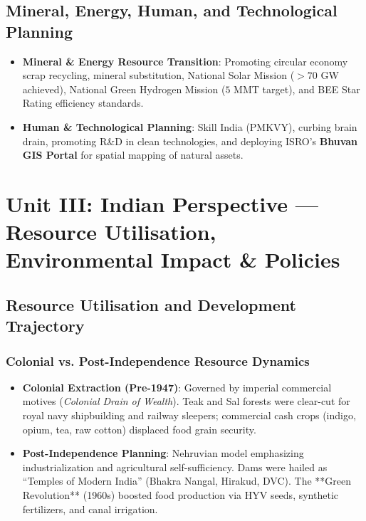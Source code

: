 \documentclass[11pt,a4paper]{article}
\begin{document}
\subsection{Mineral, Energy, Human, and Technological Planning}
\begin{itemize}[leftmargin=*]
  \item \textbf{Mineral \& Energy Resource Transition}: Promoting circular economy scrap recycling, mineral substitution, National Solar Mission ($>70$ GW achieved), National Green Hydrogen Mission ($5$ MMT target), and BEE Star Rating efficiency standards.
  \item \textbf{Human \& Technological Planning}: Skill India (PMKVY), curbing brain drain, promoting R\&D in clean technologies, and deploying ISRO's \textbf{Bhuvan GIS Portal} for spatial mapping of natural assets.
\end{itemize}

\newpage
\section{Unit III: Indian Perspective --- Resource Utilisation, Environmental Impact \& Policies}

\subsection{Resource Utilisation and Development Trajectory}

\subsubsection{Colonial vs. Post-Independence Resource Dynamics}
\begin{itemize}[leftmargin=*]
  \item \textbf{Colonial Extraction (Pre-1947)}: Governed by imperial commercial motives (\textit{Colonial Drain of Wealth}). Teak and Sal forests were clear-cut for royal navy shipbuilding and railway sleepers; commercial cash crops (indigo, opium, tea, raw cotton) displaced food grain security.
  \item \textbf{Post-Independence Planning}: Nehruvian model emphasizing industrialization and agricultural self-sufficiency. Dams were hailed as ``Temples of Modern India'' (Bhakra Nangal, Hirakud, DVC). The **Green Revolution** (1960s) boosted food production via HYV seeds, synthetic fertilizers, and canal irrigation.
\end{itemize}
\end{document}
